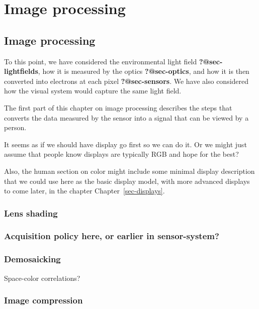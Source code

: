 \documentclass[
  letterpaper,
]{book}
\begin{document}
\part{Image processing}

\chapter{Image processing}\label{sec-imgprocessing}

To this point, we have considered the environmental light field
\textbf{?@sec-lightfields}, how it is measured by the optics
\textbf{?@sec-optics}, and how it is then converted into electrons at
each pixel \textbf{?@sec-sensors}. We have also considered how the
visual system would capture the same light field.

The first part of this chapter on image processing describes the steps
that converts the data measured by the sensor into a signal that can be
viewed by a person.

It seems as if we should have display go first so we can do it. Or we
might just assume that people know displays are typically RGB and hope
for the best?

Also, the human section on color might include some minimal display
description that we could use here as the basic display model, with more
advanced displays to come later, in the chapter
Chapter~\ref{sec-displays}.

\section{Lens shading}\label{lens-shading}

\section{Acquisition policy here, or earlier in
sensor-system?}\label{acquisition-policy-here-or-earlier-in-sensor-system}

\section{Demosaicking}\label{demosaicking}

Space-color correlations?

\section{Image compression}\label{image-compression}
\end{document}
